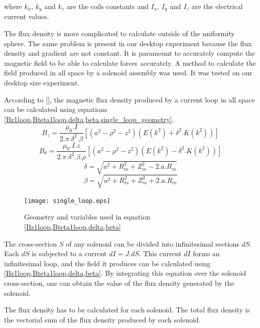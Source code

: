 \documentclass[letterpaper, 10 pt, conference]{ieeeconf}  %
\begin{document}
where $k_x$, $k_y$ and $k_z$ are the coils constants and $I_x$, $I_y$ and $I_z$ are the electrical current values.\par

The flux density is more complicated to calculate outside of the uniformity sphere. The same problem is present in our desktop experiment because the flux density and gradient are not constant. It is paramount to accurately compute the magnetic field to be able to calculate forces accurately. A method to calculate the field produced in all space by a solenoid assembly was used. It was tested on our desktop size experiment.\par
According to [], the magnetic flux density produced by a current loop in all space can be calculated using equations \cref{Bz1loop,Bteta1loop,delta,beta,single_loop_geometry}.
\begin{equation}
B_z=\frac{\mu _0.I}{2.\pi.\delta ^{2}.\beta  }\left [ \left ( a^2-\rho ^2-z^2 \right )(E(k^2)+\delta ^2.K(k^2)) \right ] 
\label{Bz1loop}
\end{equation}
\begin{equation}
B_\theta=\frac{\mu _0.I.z}{2.\pi.\delta ^{2}.\beta.\rho   }\left [ \left ( a^2-\rho ^2-z^2 \right )(E(k^2)-\delta ^2.K(k^2)) \right ]
\label{Bteta1loop}
\end{equation}
\begin{equation}
\delta =\sqrt{a^2+R_m^2+Z_m^2-2.a.R_m}
\label{delta}
\end{equation}
\begin{equation}
\beta =\sqrt{a^2+R_m^2+Z_m^2+2.a.R_m}
\label{beta}
\end{equation}

\begin{figure}
  \texttt{[image: single\_loop.eps]}
  \caption{Geometry and variables used in equation \cref{Bz1loop,Bteta1loop,delta,beta}}
  \label{single_loop_geometry}
\end{figure}

The cross-section $S$ of any solenoid can be divided into infinitesimal sections $dS$. Each $dS$ is subjected to a current $dI=J.dS$. This current $dI$ forms an infinitesimal loop, and the field it produces can be calculated using \cref{Bz1loop,Bteta1loop,delta,beta}. By integrating this equation over the solenoid cross-section, one can obtain the value of the flux density generated by the solenoid.\par
The flux density has to be calculated for each solenoid. The total flux density is the vectorial sum of the flux density produced by each solenoid.
\end{document}
